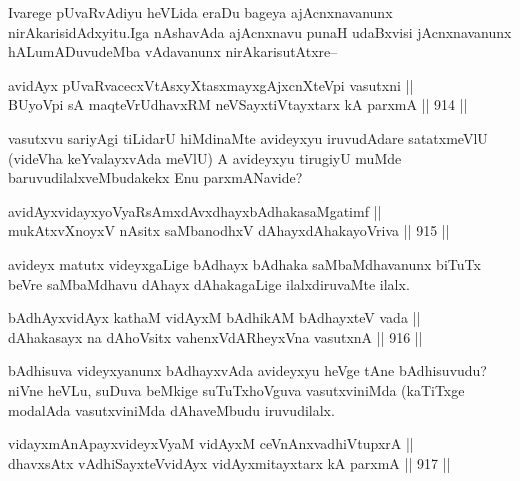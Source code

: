 \begin{artha}
Ivarege pUvaRvAdiyu heVLida eraDu bageya ajAcnxnavanunx nirAkarisidAdxyitu.Iga nAshavAda ajAcnxnavu  punaH udaBxvisi jAcnxnavanunx hALumADuvudeMba vAdavanunx nirAkarisutAtxre--
\end{artha}

\begin{shl}
avidAyx pUvaRvacecxVtAsxyXtasxmayxgAjxcnXteV\s pi vasutxni || \\
BUyoV\s pi sA maqteVrUdhavxRM neVSayxtiVtayxtarx kA parxmA \hfill || 914 ||  
\end{shl}

\begin{artha}
vasutxvu sariyAgi tiLidarU hiMdinaMte avideyxyu iruvudAdare satatxmeVlU (videVha keYvalayxvAda meVlU) A avideyxyu tirugiyU muMde baruvudilalxveMbudakekx Enu parxmANavide?
\end{artha}

\begin{shl}
avidAyxvidayxyoVyaRsAmxdAvxdhayxbAdhakasaMgatimf || \\
mukAtxvX\s noyxV nAsitx saMbanodhxV dAhayxdAhakayoVriva \hfill || 915 || 
\end{shl}

\begin{artha}
avideyx matutx videyxgaLige bAdhayx bAdhaka saMbaMdhavanunx biTuTx beVre saMbaMdhavu dAhayx dAhakagaLige ilalxdiruvaMte ilalx.
\end{artha}


\begin{shl}
bAdhAyx\s vidAyx kathaM vidAyxM bAdhikAM bAdhayxteV vada ||  \\
dAhakasayx na dAhoV\s sitx vahenxVdARheyxVna vasutxnA \hfill || 916 ||  
\end{shl}

\begin{artha}
bAdhisuva videyxyanunx bAdhayxvAda avideyxyu heVge tAne bAdhisuvudu? niVne heVLu, suDuva beMkige suTuTxhoVguva vasutxviniMda (kaTiTxge modalAda vasutxviniMda dAhaveMbudu iruvudilalx.
\end{artha}


\begin{shl}
vidayxmAnA\s payxvideyxVyaM vidAyxM ceVnAnxvadhiVtupxrA || \\
dhavxsAtx vAdhiSayxteV\s vidAyx vidAyxmitayxtarx kA parxmA \hfill || 917 ||  
\end{shl}

